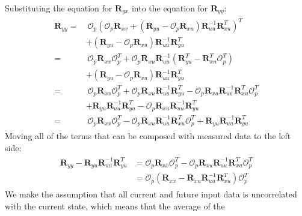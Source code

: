 \documentclass[letterpaper,10pt,english]{sphinxmanual}
\begin{document}
\sphinxAtStartPar
Substituting the equation for \(\bm{R}_{yx}\) into the equation
for \(\bm{R}_{yy}\):
\begin{equation*}
\begin{split}\begin{aligned}
\bm{R}_{yy} =& ~\mathcal{O}_{p}
\left(\mathcal{O}_{p}\bm{R}_{xx} + \left( \bm{R}_{yu} - \mathcal{O}_{p}\bm{R}_{xu} \right)\bm{R}_{uu}^{-1}\bm{R}_{xu}^{T}\right)^{T}
\\
&+
\left( \bm{R}_{yu} - \mathcal{O}_{p}\bm{R}_{xu} \right)\bm{R}_{uu}^{-1}\bm{R}_{yu}^{T}
\\
=& ~\mathcal{O}_{p}\bm{R}_{xx}\mathcal{O}_{p}^{T}
 + \mathcal{O}_{p}\bm{R}_{xu}\bm{R}_{uu}^{-1} \left( \bm{R}_{yu}^{T} - \bm{R}_{xu}^{T}\mathcal{O}_{p}^{T} \right)
\\
&+
\left( \bm{R}_{yu} - \mathcal{O}_{p}\bm{R}_{xu} \right)\bm{R}_{uu}^{-1}\bm{R}_{yu}^{T}
\\
=& ~\mathcal{O}_{p}\bm{R}_{xx}\mathcal{O}_{p}^{T}
 + \mathcal{O}_{p}\bm{R}_{xu}\bm{R}_{uu}^{-1}  \bm{R}_{yu}^{T} - \mathcal{O}_{p}\bm{R}_{xu}\bm{R}_{uu}^{-1} \bm{R}_{xu}^{T}\mathcal{O}_{p}^{T}
\\
&+
 \bm{R}_{yu}\bm{R}_{uu}^{-1}\bm{R}_{yu}^{T} - \mathcal{O}_{p}\bm{R}_{xu} \bm{R}_{uu}^{-1}\bm{R}_{yu}^{T}
\\
=& ~\mathcal{O}_{p}\bm{R}_{xx}\mathcal{O}_{p}^{T}
 - \mathcal{O}_{p}\bm{R}_{xu}\bm{R}_{uu}^{-1} \bm{R}_{xu}^{T}\mathcal{O}_{p}^{T} +
 \bm{R}_{yu}\bm{R}_{uu}^{-1}\bm{R}_{yu}^{T}
\end{aligned}\end{split}
\end{equation*}
\sphinxAtStartPar
Moving all of the terms that can be composed with measured data to the
left side:
\begin{equation*}
\begin{split}\begin{aligned}
\bm{R}_{yy} - \bm{R}_{yu}\bm{R}_{uu}^{-1}\bm{R}_{yu}^{T}
&= \mathcal{O}_{p}\bm{R}_{xx}\mathcal{O}_{p}^{T} - \mathcal{O}_{p}\bm{R}_{xu}\bm{R}_{uu}^{-1} \bm{R}_{xu}^{T}\mathcal{O}_{p}^{T} \\
&= \mathcal{O}_{p}\left( \bm{R}_{xx} - \bm{R}_{xu}\bm{R}_{uu}^{-1} \bm{R}_{xu}^{T} \right) \mathcal{O}_{p}^{T}
\end{aligned}\end{split}
\end{equation*}
\sphinxAtStartPar
We make the assumption that all current and future input data is
uncorrelated with the current state, which means that the average of the
\end{document}
